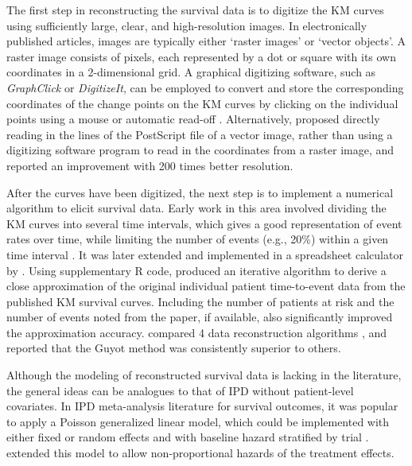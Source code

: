 \documentclass[12pt]{article}
\theoremstyle{mystyle}
\begin{document}
The first step in reconstructing the survival data is to digitize the KM curves using sufficiently large, clear, and high-resolution images. In electronically published articles, images are typically either `raster images' or `vector objects'. A raster image consists of pixels, each represented by a dot or square with its own coordinates in a 2-dimensional grid. A graphical digitizing software, such as \textit{GraphClick} or \textit{DigitizeIt}, can be employed to convert and store the corresponding coordinates of the change points on the KM curves by clicking on the individual points using a mouse or automatic read-off \citep{Guyot2012}.  Alternatively, \cite{Liu2014} proposed directly reading in the lines of the PostScript file of a vector image, rather than using a digitizing software program to read in the coordinates from a raster image, and reported an improvement with 200 times better resolution.

After the curves have been digitized, the next step is to implement a numerical algorithm to elicit survival data. Early work in this area involved dividing the KM curves into several time intervals, which gives a good representation of event rates over time, while limiting the number of events (e.g., 20\%) within a given time interval \cite{Parmar1998}. It was later extended and implemented in a spreadsheet calculator by \cite{Tierney2007}. Using supplementary R code, \cite{Guyot2012} produced an iterative algorithm to derive a close approximation of the original individual patient time-to-event data from the published KM survival curves. Including the number of patients at risk and the number of events noted from the paper, if available, also significantly improved the approximation accuracy. \cite{Saluja2019} compared 4 data reconstruction algorithms \citep{Guyot2012, Hoyle2011, Parmar1998, Williamson2002}, and reported that the Guyot method was consistently superior to others.
	
Although the modeling of reconstructed survival data is lacking in the literature, the general ideas can be analogues to that of IPD without patient-level covariates. In IPD meta-analysis literature for survival outcomes, it was popular to apply a Poisson generalized linear model, which could be implemented with either fixed or random effects and with baseline hazard stratified by trial \citep{dear1994iterative, Arends2008}. \cite{Crowther2012} extended this model to allow non‐proportional hazards of the treatment effects. 
\end{document}
